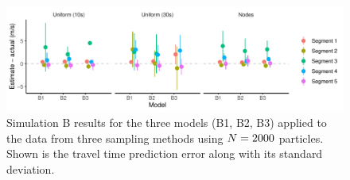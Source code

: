 \begin{knitrout}\small
{}\color{fgcolor}\begin{figure}[p]
\includegraphics[width=\linewidth]{figure/sim2_pf-1} \caption[Results for simulation B]{Simulation B results for the three models (B1, B2, B3) applied to the data from three sampling methods using $N=2000$ particles. Shown is the travel time prediction error along with its standard deviation.}\label{fig:sim2_pf}
\end{figure}


\end{knitrout}





